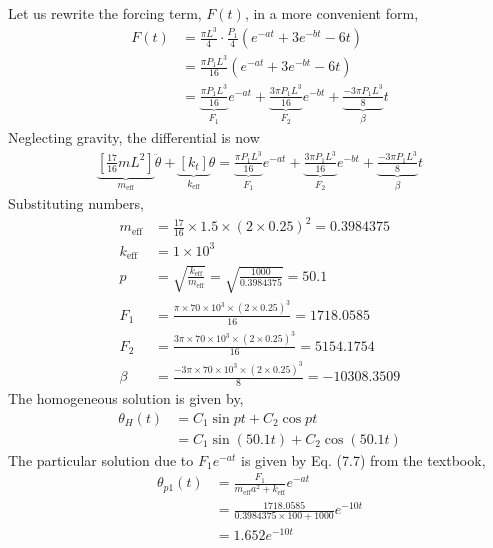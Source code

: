 \subsection{}
Let us rewrite the forcing term, $F(t)$, in a more convenient form,
\begin{align*}
    F(t) &= \frac{\pi L^3}{4}\cdot \frac{P_1}{4} \left(e^{-at} + 3e^{-bt} - 6t \right) \\
    &= \frac{\pi P_1 L^3}{16} \left(e^{-at} + 3e^{-bt} - 6t \right) \\
    & = \underbrace{\frac{\pi P_1 L^3}{16}}_{F_1} e^{-at} + \underbrace{\frac{3\pi P_1 L^3}{16}}_{F_2} e^{-bt} + \underbrace{\frac{-3\pi P_1 L^3}{8}}_{\beta} t
\end{align*}
Neglecting gravity, the differential is now
\begin{align*}
    \underbrace{\left[\frac{17}{16} m L^2\right]}_{m_{\text{eff}}} \ddot{\theta} + \underbrace{\left[k_t\right]}_{k_{\text{eff}}} \theta = \underbrace{\frac{\pi P_1 L^3}{16}}_{F_1} e^{-at} + \underbrace{\frac{3\pi P_1 L^3}{16}}_{F_2} e^{-bt} + \underbrace{\frac{-3\pi P_1 L^3}{8}}_{\beta} t
\end{align*}
Substituting numbers,
\begin{align*}
    m_{\text{eff}} &= \frac{17}{16} \times 1.5 \times (2 \times 0.25)^2 = 0.3984375 \\
    k_{\text{eff}} &= 1 \times 10^3 \\
    p &= \sqrt{\frac{k_{\text{eff}}}{m_{\text{eff}}}} = \sqrt{\frac{1000}{0.3984375}} = 50.1 \\
    F_1 &= \frac{\pi \times 70 \times 10^3 \times (2 \times 0.25)^3}{16} = 1718.0585 \\
    F_2 &= \frac{3\pi \times 70 \times 10^3 \times (2 \times 0.25)^3}{16} = 5154.1754 \\
    \beta &= \frac{-3\pi \times 70 \times 10^3 \times (2 \times 0.25)^3}{8} = -10308.3509 
\end{align*}
The homogeneous solution is given by,
\begin{align*}
    \theta_H(t) &= C_1 \sin p t + C_2 \cos p t \\
    &= C_1 \sin (50.1 t) + C_2 \cos (50.1 t)
\end{align*}
The particular solution due to $F_1 e^{-at}$ is given by Eq. (7.7) from the textbook,
\begin{align*}
    \theta_{p1}(t) &= \frac{F_1}{m_{\text{eff}} a^2 + k_{\text{eff}}} e^{-at} \\
    &= \frac{1718.0585}{0.3984375 \times 100 + 1000} e^{-10t} \\
    &= 1.652 e^{-10t}
\end{align*}
